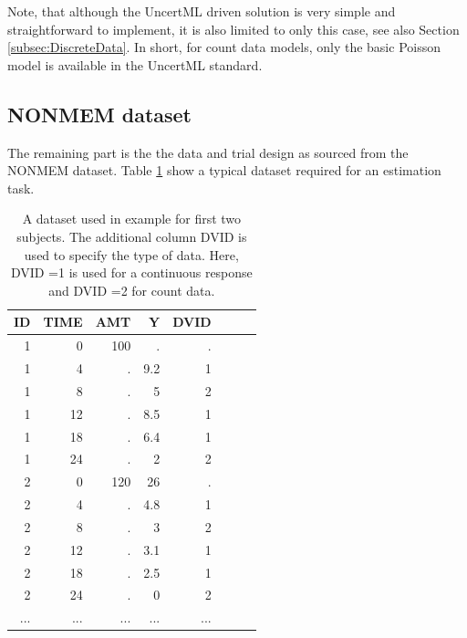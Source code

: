 Note, that although the UncertML driven solution is very simple and straightforward
to implement, it is also limited to only this case, see also Section \ref{subsec:DiscreteData}. 
In short, for count data models, only the basic Poisson model is available in the UncertML standard.


\subsection{NONMEM dataset}
\label{sec:eg6-NONMEMdataset}
The remaining part is the the data and trial design as sourced from the 
NONMEM dataset. Table \ref{tab:example6_dataSet} show a typical dataset required for 
an estimation task.
\begin{table}[htdp]
\begin{center}
\small
\renewcommand{\arraystretch}{1.1}%
\begin{tabular}{rrrrrrrr}\toprule
ID 	& TIME	& AMT	& Y		& DVID \\ \midrule
1 	& 0 		& 100 	& . 		& . \\ 
1 	& 4 		& . 		& 9.2 	& 1 \\ 
1 	& 8 		& . 		& 5 		& 2 \\ 
1 	& 12 	& . 		& 8.5 	& 1 \\ 
1 	& 18 	& . 		& 6.4 	& 1 \\ 
1 	& 24 	& . 		& 2 		& 2 \\ 
2 	& 0 		& 120	&  26 	& . \\ 
2 	& 4 		& . 		& 4.8 	& 1 \\ 
2 	& 8 		& . 		& 3 		& 2 \\ 
2 	& 12 	& . 		& 3.1 	& 1 \\ 
2 	& 18 	& . 		& 2.5 	& 1 \\ 
2 	& 24 	& . 		& 0 		& 2 \\ 
...	& ...		& ...		& ...		& ...	\\ \bottomrule
\end{tabular}
\end{center}
\caption{A dataset used in example for first two subjects.
The additional column DVID is used to specify the type of data. Here, 
DVID =1 is used for a continuous response and DVID =2 for count data.}
\label{tab:example6_dataSet}
\end{table}%

